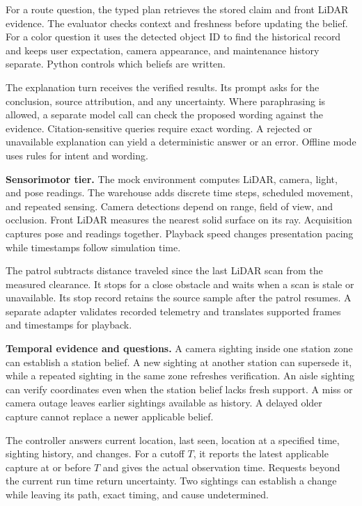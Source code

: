\documentclass[11pt,a4paper,twocolumn]{article}
\begin{document}
For a route question, the typed plan retrieves the stored claim and
front LiDAR evidence. The evaluator checks context and freshness before
updating the belief. For a color question it uses the detected object
ID to find the historical record and keeps user expectation, camera
appearance, and maintenance history separate. Python controls which
beliefs are written.

The explanation turn receives the verified results. Its prompt asks
for the conclusion, source attribution, and any uncertainty. Where
paraphrasing is allowed, a separate model call can check the proposed
wording against the evidence. Citation-sensitive queries require exact
wording. A rejected or unavailable explanation can yield a deterministic
answer or an error. Offline mode uses rules for intent and wording.

\textbf{Sensorimotor tier.} The mock environment computes LiDAR, camera,
light, and pose readings. The warehouse adds discrete time steps,
scheduled movement, and repeated sensing. Camera detections depend on
range, field of view, and occlusion. Front LiDAR measures the nearest
solid surface on its ray. Acquisition captures pose and readings
together. Playback speed changes presentation pacing while timestamps
follow simulation time.

The patrol subtracts distance traveled since the last LiDAR scan from
the measured clearance. It stops for a close obstacle and waits when a
scan is stale or unavailable. Its stop record retains the source sample
after the patrol resumes. A separate adapter validates recorded
telemetry and translates supported frames and timestamps for playback.

\textbf{Temporal evidence and questions.} A camera sighting inside one
station zone can establish a station belief. A new sighting at another
station can supersede it, while a repeated sighting in the same zone
refreshes verification. An aisle sighting can verify coordinates even
when the station belief lacks fresh support. A miss or camera outage
leaves earlier sightings available as history. A delayed older capture
cannot replace a newer applicable belief.

The controller answers current location, last seen, location at a
specified time, sighting history, and changes. For a cutoff $T$, it
reports the latest applicable capture at or before $T$ and gives the
actual observation time. Requests beyond the current run time return
uncertainty. Two sightings can establish a change while leaving its
path, exact timing, and cause undetermined.
\end{document}
